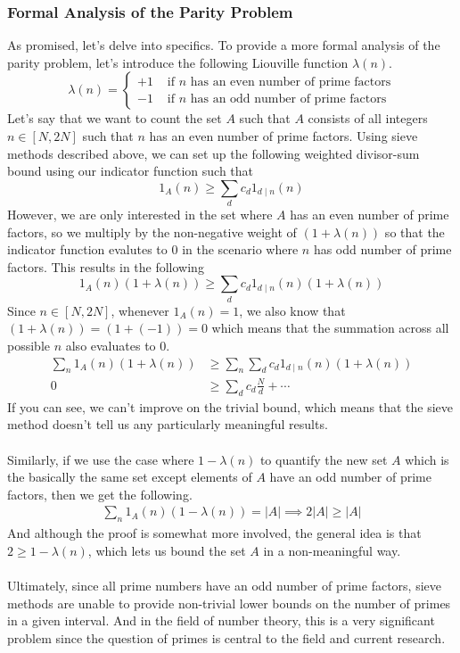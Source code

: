\subsubsection{Formal Analysis of the Parity Problem}
As promised, let's delve into specifics. To provide a more formal analysis of the parity problem, let's introduce the following Liouville function $\lambda(n)$.
$$
\lambda(n) = \begin{cases}
  +1 & \text{ if } n \text{ has an even number of prime factors}\\
  -1 & \text{ if } n \text{ has an odd number of prime factors}
\end{cases}
$$
Let's say that we want to count the set $A$ such that $A$ consists of all integers $n \in [N,2N]$ such that $n$ has an even number of prime factors. Using sieve methods described above, we can set up the following weighted divisor-sum bound using our indicator function such that
$$
1_A(n) \geq \sum_{d} c_d 1_{d \mid n} (n)
$$
However, we are only interested in the set where $A$ has an even number of prime factors, so we multiply by the non-negative weight of $(1 + \lambda(n))$ so that the indicator function evalutes to $0$ in the scenario where $n$ has odd number of prime factors. This results in the following
$$
1_A(n) (1 + \lambda(n)) \geq \sum_{d} c_d 1_{d \mid n} (n) (1 + \lambda(n))
$$
Since $n \in [N,2N]$, whenever $1_A(n) = 1$, we also know that $(1 + \lambda(n)) = (1 + (-1)) = 0$ which means that the summation across all possible $n$ also evaluates to $0$.
\begin{align*}
  \sum_{n} 1_A(n) (1 + \lambda(n)) &\geq \sum_{n} \sum_{d} c_d 1_{d \mid n} (n) (1 + \lambda(n))\\
  0 &\geq \sum_{d} c_d \frac{N}{d} + \cdots
\end{align*}
If you can see, we can't improve on the trivial bound, which means that the sieve method doesn't tell us any particularly meaningful results.\\
\\
Similarly, if we use the case where $1 -\lambda(n)$ to quantify the new set $A$ which is the basically the same set except elements of $A$ have an odd number of prime factors, then we get the following.
\begin{align*}
  \sum_{n} 1_A(n) (1 - \lambda(n)) = |A| \implies 2|A| \geq |A|
\end{align*}
And although the proof is somewhat more involved, the general idea is that $2 \geq 1 - \lambda(n)$, which lets us bound the set $A$ in a non-meaningful way.\\
\\
Ultimately, since all prime numbers have an odd number of prime factors, sieve methods are unable to provide non-trivial lower bounds on the number of primes in a given interval. 
And in the field of number theory, this is a very significant problem since the question of primes is central to the field and current research.







